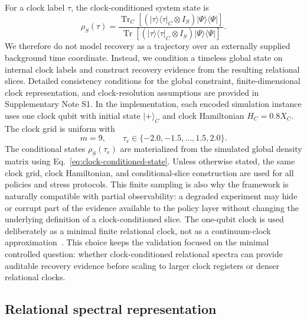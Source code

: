 \documentclass{iopjournal}
\begin{document}
For a clock label $\tau$, the clock-conditioned system state is
\begin{equation}
\rho_S(\tau)
=
\frac{
\operatorname{Tr}_{C}\!\left[
\left(|\tau\rangle\langle\tau|_{C}\otimes I_S\right)
|\Psi\rangle\langle\Psi|
\right]
}{
\operatorname{Tr}\!\left[
\left(|\tau\rangle\langle\tau|_{C}\otimes I_S\right)
|\Psi\rangle\langle\Psi|
\right]
}.
\label{eq:clock-conditioned-state}
\end{equation}
We therefore do not model recovery as a trajectory over an externally supplied
background time coordinate. Instead, we condition a timeless global state on
internal clock labels and construct recovery evidence from the resulting
relational slices. Detailed consistency conditions for the global constraint,
finite-dimensional clock representation, and clock-resolution assumptions are
provided in Supplementary Note S1.
In the implementation, each encoded simulation instance uses one clock qubit with
initial state $|+\rangle_C$ and clock Hamiltonian $H_C=0.8X_C$. The clock grid is
uniform with
\begin{equation}
m=9,\qquad
\tau_r\in\{-2.0,-1.5,\ldots,1.5,2.0\}.
\end{equation}
The conditional states $\rho_S(\tau_r)$ are materialized from the simulated global
density matrix using Eq.~\eqref{eq:clock-conditioned-state}. Unless otherwise
stated, the same clock grid, clock Hamiltonian, and conditional-slice construction
are used for all policies and stress protocols. This finite sampling is also why
the framework is naturally compatible with partial observability: a degraded
experiment may hide or corrupt part of the evidence available to the policy layer
without changing the underlying definition of a clock-conditioned slice.
The one-qubit clock is used deliberately as a minimal finite relational clock,
not as a continuum-clock
approximation~\cite{Foti2021ClassicalEquationsPageWootters,Rijavec2023RobustnessPageWootters}.
This choice keeps the validation focused
on the minimal controlled question: whether clock-conditioned relational spectra
can provide auditable recovery evidence before scaling to larger clock registers
or denser relational clocks.

\subsection{Relational spectral representation}\label{subsec:spectral-representation}
\end{document}
